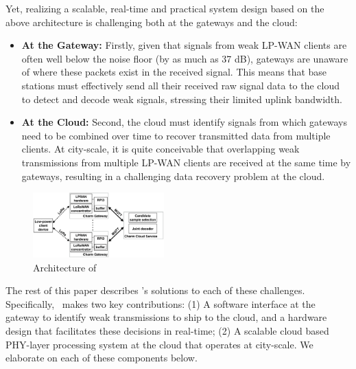 Yet, realizing a scalable, real-time and practical system design based on the above architecture is challenging both at the gateways and the cloud: 
\begin{itemize}
\item {\bf At the Gateway: } Firstly, given that signals from weak LP-WAN clients are often well below the noise floor (by as much as 37 dB), gateways are unaware of where these packets exist in the received signal. This means that base stations must effectively send all their received raw signal data to the cloud to detect and decode weak signals, stressing their limited uplink bandwidth. 
\item {\bf At the Cloud: } Second, the cloud must identify signals from which gateways need to be combined over time to recover transmitted data from multiple clients. At city-scale, it is quite conceivable that overlapping weak transmissions from multiple LP-WAN clients are received at the same time by gateways, resulting in a challenging data recovery problem at the cloud.
\end{itemize}


\begin{figure}[!htb]
    \centering
    \includegraphics[width=0.45\textwidth]{figures/charm-architecture_cropped.pdf}
    \caption{Architecture of \name}
    \label{fig:architecture}
\end{figure}


 The rest of this paper describes \name's solutions to each of these challenges. Specifically, \name\ makes two key contributions: (1) A software interface at the gateway to identify weak transmissions to ship to the cloud, and a hardware design that facilitates these decisions in real-time; (2) A scalable cloud based PHY-layer processing system at the cloud that operates at city-scale. We elaborate on each of these components below. 






